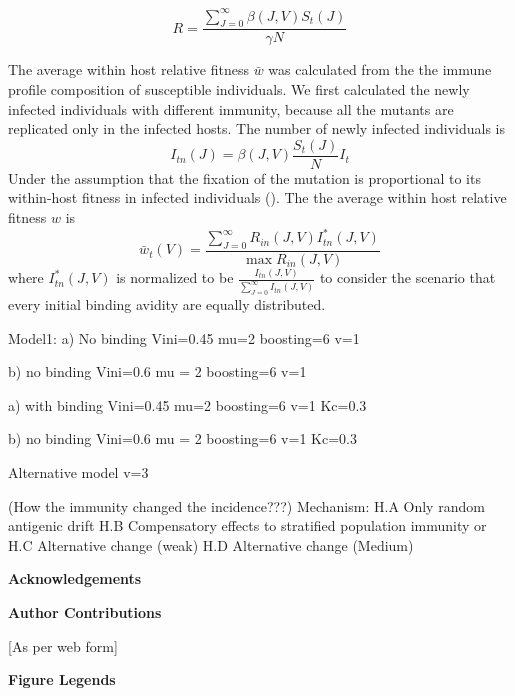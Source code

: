 \documentclass[12pt,a4paper]{article}
\begin{document}
\begin{equation}
R=\frac{\sum_{J=0}^{\infty}\beta(J,V)S_{t}(J)}{\gamma N}
\end{equation}

The average within host relative fitness $\bar{w}$ was calculated from the the immune profile composition of susceptible individuals. We first calculated the newly infected individuals with different immunity, because all the mutants are replicated only in the infected hosts. The number of newly infected individuals is
\begin{equation}
I_{tn}(J) = \beta(J,V)\frac{S_{t}(J)}{N} {I_{t}}
\end{equation}
Under the assumption that the fixation of the mutation is proportional to its within-host fitness in infected individuals (\cite{Gillespie1984}). The the average within host relative fitness $w$ is
\begin{equation}
\bar{w}_{t}(V)=\frac{\sum_{J=0}^{\infty} R_{in}(J,V)I_{tn}^*(J,V)}{\max{R_{in}(J,V)}}
\end{equation}
where $I_{tn}^*(J,V)$ is normalized to be $\frac{I_{tn}(J,V)}{\sum_{J=0}^{\infty}I_{tn}(J,V)}$ to consider the scenario that every initial binding avidity are equally distributed. 




Model1:
a) No binding
Vini=0.45
mu=2
boosting=6
v=1

b) no binding Vini=0.6
mu = 2
boosting=6
v=1

a) with binding
Vini=0.45
mu=2
boosting=6
v=1
Kc=0.3

b) no binding Vini=0.6
mu = 2
boosting=6
v=1
Kc=0.3

Alternative model
v=3



   
  

  
 


     
(How the immunity changed the incidence???) 
Mechanism:
H.A Only random antigenic drift
H.B Compensatory effects to stratified population immunity or
H.C Alternative change (weak)
H.D Alternative change (Medium)
   





{\bf Acknowledgements}


{\bf Author Contributions}

[As per web form]

{\bf Figure Legends}

\clearpage
\end{document}
